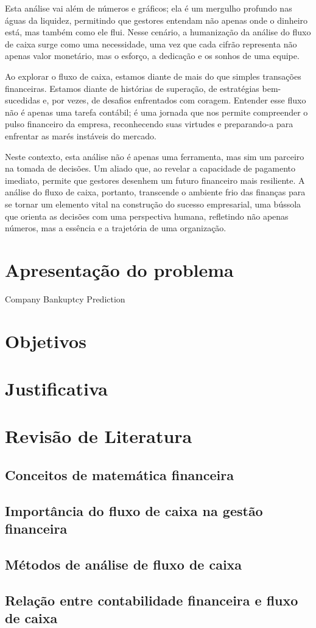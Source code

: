 Esta análise vai além de números e gráficos; ela é um mergulho profundo nas águas 
da liquidez, permitindo que gestores entendam não apenas onde o dinheiro está,
mas também como ele flui. Nesse cenário, a humanização da análise do fluxo de caixa 
surge como uma necessidade, uma vez que cada cifrão representa não apenas valor 
monetário, mas o esforço, a dedicação e os sonhos de uma equipe.

Ao explorar o fluxo de caixa, estamos diante de mais do que simples transações 
financeiras. Estamos diante de histórias de superação, de estratégias bem-sucedidas e, 
por vezes, de desafios enfrentados com coragem. Entender esse fluxo não é apenas uma 
tarefa contábil; é uma jornada que nos permite compreender o pulso financeiro da empresa, 
reconhecendo suas virtudes e preparando-a para enfrentar as marés instáveis do mercado.

Neste contexto, esta análise não é apenas uma ferramenta, mas sim um parceiro na tomada 
de decisões. Um aliado que, ao revelar a capacidade de pagamento imediato, permite que 
gestores desenhem um futuro financeiro mais resiliente. A análise do fluxo de caixa, 
portanto, transcende o ambiente frio das finanças para se tornar um elemento vital 
na construção do sucesso empresarial, uma bússola que orienta as decisões com uma 
perspectiva humana, refletindo não apenas números, mas a essência e a trajetória de 
uma organização.

\section{Apresentação do problema}
\hspace{0.7cm}Company Bankuptcy Prediction

\section{Objetivos}
\section{Justificativa}

\section{Revisão de Literatura}

\subsection{Conceitos de matemática financeira}
\subsection{Importância do fluxo de caixa na gestão financeira}
\subsection{Métodos de análise de fluxo de caixa}
\subsection{Relação entre contabilidade financeira e fluxo de caixa}
